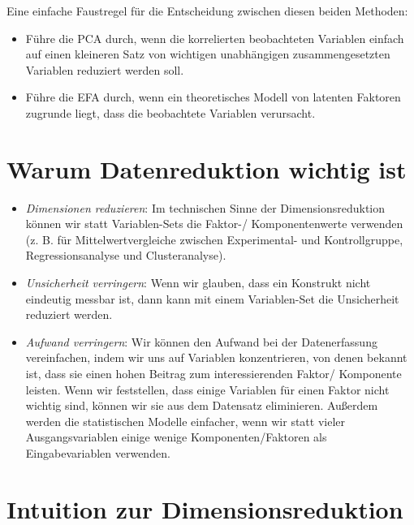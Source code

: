 \documentclass[12pt,ngerman,]{book}
\providecommand{\tightlist}{%
  \setlength{\itemsep}{0pt}\setlength{\parskip}{0pt}}
\theoremstyle{definition}
\theoremstyle{definition}
\theoremstyle{remark}
\begin{document}
Eine einfache Faustregel für die Entscheidung zwischen diesen beiden
Methoden:

\begin{itemize}
\tightlist
\item
  Führe die PCA durch, wenn die korrelierten beobachteten Variablen
  einfach auf einen kleineren Satz von wichtigen unabhängigen
  zusammengesetzten Variablen reduziert werden soll.
\item
  Führe die EFA durch, wenn ein theoretisches Modell von latenten
  Faktoren zugrunde liegt, dass die beobachtete Variablen verursacht.
\end{itemize}

\section{Warum Datenreduktion wichtig
ist}\label{warum-datenreduktion-wichtig-ist}

\begin{itemize}
\tightlist
\item
  \emph{Dimensionen reduzieren}: Im technischen Sinne der
  Dimensionsreduktion können wir statt Variablen-Sets die Faktor-/
  Komponentenwerte verwenden (z. B. für Mittelwertvergleiche zwischen
  Experimental- und Kontrollgruppe, Regressionsanalyse und
  Clusteranalyse).
\item
  \emph{Unsicherheit verringern}: Wenn wir glauben, dass ein Konstrukt
  nicht eindeutig messbar ist, dann kann mit einem Variablen-Set die
  Unsicherheit reduziert werden.
\item
  \emph{Aufwand verringern}: Wir können den Aufwand bei der
  Datenerfassung vereinfachen, indem wir uns auf Variablen
  konzentrieren, von denen bekannt ist, dass sie einen hohen Beitrag zum
  interessierenden Faktor/ Komponente leisten. Wenn wir feststellen,
  dass einige Variablen für einen Faktor nicht wichtig sind, können wir
  sie aus dem Datensatz eliminieren. Außerdem werden die statistischen
  Modelle einfacher, wenn wir statt vieler Ausgangsvariablen einige
  wenige Komponenten/Faktoren als Eingabevariablen verwenden.
\end{itemize}

\section{Intuition zur
Dimensionsreduktion}\label{intuition-zur-dimensionsreduktion}
\end{document}
